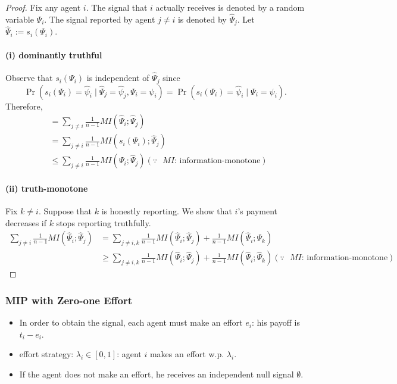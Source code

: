\documentclass[11pt,a4paper,dvipdfmx]{article}
\theoremstyle{plain}
\renewcommand{\hat}{\widehat}
\newcommand{\1}{\mathbbm{1}}
\begin{document}
\begin{proof}
	Fix any agent $i$. The signal that $i$ actually receives is denoted by a random variable $\Psi_i$. The signal reported by agent $j \neq i$ is denoted by $\hat{\Psi}_j$. Let $\hat{\Psi}_i := s_i(\Psi_i)$.
	\paragraph{(i) dominantly truthful}
	Observe that $s_i(\Psi_i)$ is independent of $\hat{\Psi}_j$ since 
	$$
	\Pr(s_i(\Psi_i) = \hat{\psi}_i \mid \hat{\Psi}_j = \hat{\psi}_j, \Psi_i = \psi_i)
	= \Pr(s_i(\Psi_i) = \hat{\psi}_i \mid  \Psi_i = \psi_i).
	$$
	Therefore, 
	\begin{align*}
		[\text{i's expected payoff}] &= \sum_{j \neq i}\frac{1}{n-1} MI(\hat{\Psi}_i; \hat{\Psi}_j) \\
		&= \sum_{j \neq i}\frac{1}{n-1} MI(s_i({\Psi}_i); \hat{\Psi}_j) \\
		&\leq \sum_{j \neq i}\frac{1}{n-1} MI(\Psi_i; \hat{\Psi}_j) (\because \text{ $MI$: information-monotone})
	\end{align*}
	
	\paragraph{(ii) truth-monotone}
	Fix $k \neq i$. Suppose that $k$ is honestly reporting. We show that $i$'s payment decreases if $k$ stops reporting truthfully.
	\begin{align*}
		\sum_{j \neq i} \frac{1}{n-1} MI(\hat{\Psi}_i; \hat{\Psi}_j)
		&= \sum_{j \neq i,k} \frac{1}{n-1} MI(\hat{\Psi}_i; \hat{\Psi}_j) + \frac{1}{n-1} MI(\hat{\Psi}_i; \Psi_k) \\
		&\geq \sum_{j \neq i,k} \frac{1}{n-1} MI(\hat{\Psi}_i; \hat{\Psi}_j) + \frac{1}{n-1} MI(\hat{\Psi}_i; \hat{\Psi}_k) (\because \text{ $MI$: information-monotone})
	\end{align*}
 \end{proof}


\subsubsection{MIP with Zero-one Effort}

\begin{itemize}
	\item In order to obtain the signal, each agent must make an effort $e_i$: his payoff is $t_i - e_i$.
	\item effort strategy: $\lambda_i \in [0,1]$: agent $i$ makes an effort w.p. $\lambda_i$.
	\item If the agent does not make an effort, he receives an independent null signal $\emptyset$.
\end{itemize}
\end{document}
